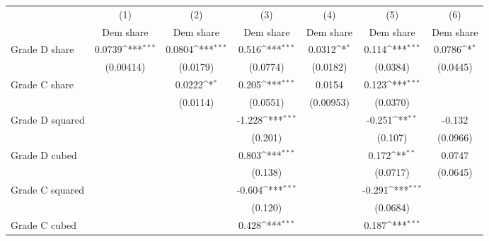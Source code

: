 {
\def\sym#1{\ifmmode^{#1}\else\(^{#1}\)\fi}
\begin{tabular}{l*{6}{c}}
\toprule
                    &\multicolumn{1}{c}{(1)}&\multicolumn{1}{c}{(2)}&\multicolumn{1}{c}{(3)}&\multicolumn{1}{c}{(4)}&\multicolumn{1}{c}{(5)}&\multicolumn{1}{c}{(6)}\\
                    &\multicolumn{1}{c}{Dem share}&\multicolumn{1}{c}{Dem share}&\multicolumn{1}{c}{Dem share}&\multicolumn{1}{c}{Dem share}&\multicolumn{1}{c}{Dem share}&\multicolumn{1}{c}{Dem share}\\
\midrule
Grade D share       &      0.0739\sym{***}&      0.0804\sym{***}&       0.516\sym{***}&      0.0312\sym{*}  &       0.114\sym{***}&      0.0786\sym{*}  \\
                    &   (0.00414)         &    (0.0179)         &    (0.0774)         &    (0.0182)         &    (0.0384)         &    (0.0445)         \\
\addlinespace
Grade C share       &                     &      0.0222\sym{*}  &       0.205\sym{***}&      0.0154         &       0.123\sym{***}&                     \\
                    &                     &    (0.0114)         &    (0.0551)         &   (0.00953)         &    (0.0370)         &                     \\
\addlinespace
Grade D squared     &                     &                     &      -1.228\sym{***}&                     &      -0.251\sym{**} &      -0.132         \\
                    &                     &                     &     (0.201)         &                     &     (0.107)         &    (0.0966)         \\
\addlinespace
Grade D cubed       &                     &                     &       0.803\sym{***}&                     &       0.172\sym{**} &      0.0747         \\
                    &                     &                     &     (0.138)         &                     &    (0.0717)         &    (0.0645)         \\
\addlinespace
Grade C squared     &                     &                     &      -0.604\sym{***}&                     &      -0.291\sym{***}&                     \\
                    &                     &                     &     (0.120)         &                     &    (0.0684)         &                     \\
\addlinespace
Grade C cubed       &                     &                     &       0.428\sym{***}&                     &       0.187\sym{***}&                     \\

\end{tabular}}
